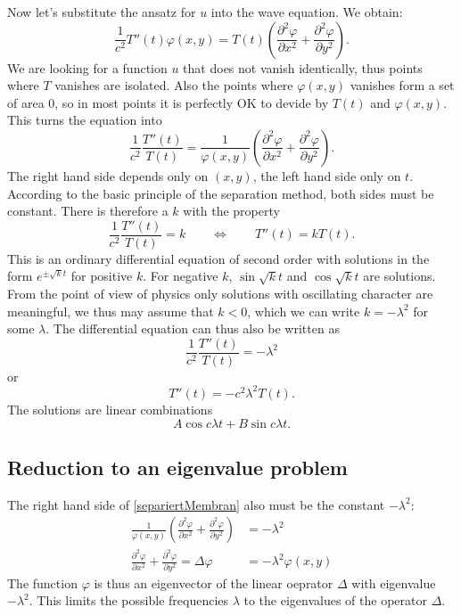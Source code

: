 Now let's substitute the ansatz for $u$ into the wave equation.
We obtain:
\[
\frac1{c^2}T''(t)\varphi(x,y)=T(t)\left(
\frac{\partial^2\varphi}{\partial x^2}
+
\frac{\partial^2\varphi}{\partial y^2}
\right).
\]
We are looking for a function $u$ that does not vanish identically,
thus points where $T$ vanishes are isolated.
Also the points where $\varphi(x,y)$ vanishes form a set of area $0$,
so in most points it is perfectly OK to devide by $T(t)$ and
$\varphi(x,y)$.
This turns the equation into
\begin{equation}
\frac1{c^2}\frac{T''(t)}{T(t)}
= \frac1{\varphi(x,y)}\left( \frac{\partial^2\varphi}{\partial x^2}
+ \frac{\partial^2\varphi}{\partial y^2} \right).
\label{separiertMembran}
\end{equation}
The right hand side depends only on $(x,y)$, the left hand side only on $t$.
According to the basic principle of the separation method, both sides
must be constant.
There is therefore a $k$ with the property
\[
\frac1{c^2}\frac{T''(t)}{T(t)}=k
\qquad\Leftrightarrow\qquad
T''(t)=k T(t).
\]
This is an ordinary differential equation of second order with solutions
in the form
$e^{\pm\sqrt{k}t}$ for positive $k$.
For negative $k$, $\sin\sqrt{k}t$ and $\cos\sqrt{k}t$ are solutions.
From the point of view of physics only solutions with oscillating
character are meaningful, we thus may assume that $k<0$, which we can
write $k=-\lambda^2$ for some $\lambda$.
The differential equation can thus also be written as
\[
\frac1{c^2}\frac{T''(t)}{T(t)}=-\lambda^2
\]
or
\[
T''(t)=-c^2\lambda^2 T(t).
\]
The solutions are linear combinations 
\[
A\cos c\lambda t+B\sin c\lambda t.
\]

\subsection{Reduction to an eigenvalue problem}
The right hand side of \eqref{separiertMembran}
also must be the constant $-\lambda^2$:
\begin{align*}
\frac1{\varphi(x,y)}\left(
\frac{\partial^2\varphi}{\partial x^2}
+
\frac{\partial^2\varphi}{\partial y^2}
\right)&=-\lambda^2\\
\frac{\partial^2\varphi}{\partial x^2}
+
\frac{\partial^2\varphi}{\partial y^2}
=
\Delta\varphi
&=-\lambda^2
\varphi(x,y)
\end{align*}
The function $\varphi$ is thus an eigenvector of the linear 
oeprator $\Delta$ with eigenvalue $-\lambda^2$.
This limits the possible frequencies $\lambda$ to the eigenvalues
of the operator $\Delta$.

